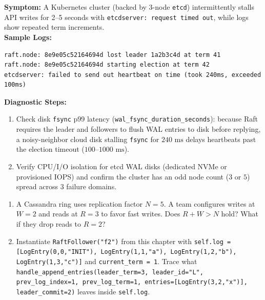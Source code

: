 \begin{realworldbox}
\textbf{Symptom:} A Kubernetes cluster (backed by 3-node \texttt{etcd}) intermittently stalls API writes for 2--5 seconds with \texttt{etcdserver: request timed out}, while logs show repeated term increments.\\
\textbf{Sample Logs:}
\begin{verbatim}
raft.node: 8e9e05c52164694d lost leader 1a2b3c4d at term 41
raft.node: 8e9e05c52164694d starting election at term 42
etcdserver: failed to send out heartbeat on time (took 240ms, exceeded 100ms)
\end{verbatim}
\textbf{Diagnostic Steps:}
\begin{enumerate}[leftmargin=16pt]
  \item Check disk \texttt{fsync} p99 latency (\texttt{wal\_fsync\_duration\_seconds}): because Raft requires the leader and followers to flush WAL entries to disk before replying, a noisy-neighbor cloud disk stalling \texttt{fsync} for $240\text{ ms}$ delays heartbeats past the election timeout ($100\text{--}1000\text{ ms}$).
  \item Verify CPU/I/O isolation for etcd WAL disks (dedicated NVMe or provisioned IOPS) and confirm the cluster has an odd node count ($3$ or $5$) spread across 3 failure domains.
\end{enumerate}
\end{realworldbox}

\begin{tryityourselfbox}
\begin{enumerate}[leftmargin=18pt]
  \item A Cassandra ring uses replication factor $N = 5$. A team configures writes at $W = 2$ and reads at $R = 3$ to favor fast writes. Does $R + W > N$ hold? What if they drop reads to $R = 2$?
  \item Instantiate \texttt{RaftFollower("f2")} from this chapter with \texttt{self.log = [LogEntry(0,0,"INIT"), LogEntry(1,1,"a"), LogEntry(1,2,"b"), LogEntry(1,3,"c")]} and \texttt{current\_term = 1}. Trace what \texttt{handle\_append\_entries(leader\_term=3, leader\_id="L", prev\_log\_index=1, prev\_log\_term=1, entries=[LogEntry(3,2,"x")], leader\_commit=2)} leaves inside \texttt{self.log}.
\end{enumerate}
\end{tryityourselfbox}

